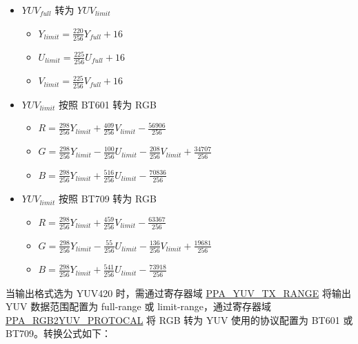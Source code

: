 \documentclass[main\_\_CN.tex]{subfiles}
\begin{document}
\begin{itemize}
    \item $YUV_{full}$ 转为 $YUV_{limit}$
        \begin{itemize}
            \item $Y_{limit} = \frac{220}{256} Y_{full} + 16$
            \item $U_{limit} = \frac{225}{256} U_{full} + 16$
            \item $V_{limit} = \frac{225}{256} V_{full} + 16$
        \end{itemize}
    \item $YUV_{limit}$ 按照 BT601 转为 RGB
        \begin{itemize}
            \item $R = \frac{298}{256}Y_{limit} + \frac{409}{256}V_{limit} - \frac{56906}{256}$
            \item $G = \frac{298}{256}Y_{limit} - \frac{100}{256}U_{limit} - \frac{208}{256}V_{limit} + \frac{34707}{256}$
            \item $B = \frac{298}{256}Y_{limit} + \frac{516}{256}U_{limit} -  \frac{70836}{256}$
        \end{itemize}
    \item $YUV_{limit}$ 按照 BT709 转为 RGB
        \begin{itemize}
            \item $R = \frac{298}{256}Y_{limit} + \frac{459}{256}V_{limit} - \frac{63367}{256}$
            \item $G = \frac{298}{256}Y_{limit} - \frac{55}{256}U_{limit} - \frac{136}{256}V_{limit} + \frac{19681}{256}$
            \item $B = \frac{298}{256}Y_{limit} + \frac{541}{256}U_{limit} -  \frac{73918}{256}$
        \end{itemize}
\end{itemize}

当输出格式选为 YUV420 时，需通过寄存器域 \hyperref[fielddesc:PPAYUVTXRANGE]{PPA\_YUV\_TX\_RANGE} 将输出 YUV 数据范围配置为 full-range 或 limit-range，通过寄存器域 \hyperref[fielddesc:PPARGB2YUVPROTOCAL]{PPA\_RGB2YUV\_PROTOCAL} 将 RGB 转为 YUV 使用的协议配置为 BT601 或 BT709。转换公式如下：
\end{document}
